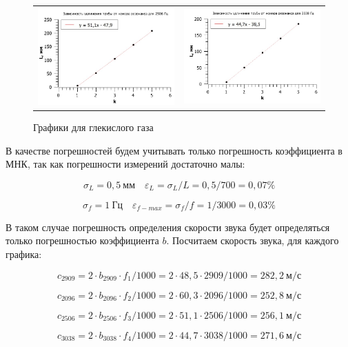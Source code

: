 \documentclass[12pt,a4paper]{article}
\begin{document}
\begin{figure}[ht]\center
\begin{tabular}{cc}
\includegraphics[width=60mm]{CO2_3-1.jpg}
&
\includegraphics[width=60mm]{CO2_4-1.jpg}
\end{tabular}
\caption{Графики для глекислого газа}
\end{figure}

\vspace{0.5cm}

В качестве погрешностей будем учитывать только погрешность коэффициента в МНК, так как погрешности измерений достаточно малы:

\[\sigma_L = 0,5 \: \textit{мм} \quad \varepsilon_L = \sigma_L / L = 0,5 / 700 = 0,07\%\]

\[\sigma_f = 1 \: \textit{Гц} \quad \varepsilon_{f-max} = \sigma_f / f = 1 / 3000 = 0,03\%\]

В таком случае погрешность определения скорости звука будет определяться только погрешностью коэффициента  $b$. Посчитаем скорость звука, для каждого графика:

\[c_{2909} = 2 \cdot b_{2909} \cdot f_1 / 1000 = 2 \cdot 48,5 \cdot 2909 /1000 = 282,2 \: \textit{м}/\textit{с} \]

\[c_{2096} = 2 \cdot b_{2096} \cdot f_2 / 1000 = 2 \cdot 60,3 \cdot 2096 /1000 = 252,8 \: \textit{м}/\textit{с} \]

\[c_{2506} = 2 \cdot b_{2506} \cdot f_3 / 1000 = 2 \cdot 51,1 \cdot 2506 /1000 = 256,1 \: \textit{м}/\textit{с} \]

\[c_{3038} = 2 \cdot b_{3038} \cdot f_4 / 1000 = 2 \cdot 44,7 \cdot 3038 /1000 = 271,6 \: \textit{м}/\textit{с} \]
\end{document}
